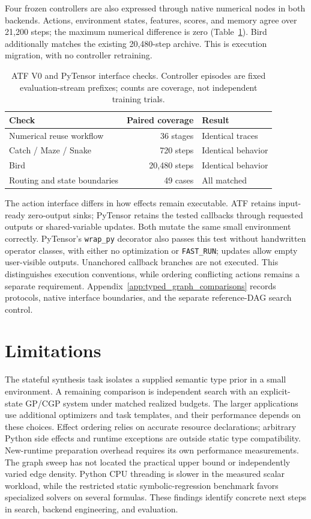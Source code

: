 Four frozen controllers are also expressed through native numerical nodes in both backends. Actions, environment states, features, scores, and memory agree over 21,200 steps; the maximum numerical difference is zero (Table~\ref{tab:typed_graph_interfaces}). Bird additionally matches the existing 20,480-step archive. This is execution migration, with no controller retraining.

\begin{table}[tb]
\centering\small
\caption{ATF V0 and PyTensor interface checks. Controller episodes are fixed evaluation-stream prefixes; counts are coverage, not independent training trials.}
\label{tab:typed_graph_interfaces}
\begin{tabular}{lrl}
\toprule
Check & Paired coverage & Result \\
\midrule
Numerical reuse workflow & 36 stages & Identical traces \\
Catch / Maze / Snake & 720 steps & Identical behavior \\
Bird & 20,480 steps & Identical behavior \\
Routing and state boundaries & 49 cases & All matched \\
\bottomrule
\end{tabular}
\end{table}

The action interface differs in how effects remain executable. ATF retains input-ready zero-output sinks; PyTensor retains the tested callbacks through requested outputs or shared-variable updates. Both mutate the same small environment correctly. PyTensor's \texttt{wrap\_py} decorator also passes this test without handwritten operator classes, with either no optimization or \texttt{FAST\_RUN}; updates allow empty user-visible outputs. Unanchored callback branches are not executed. This distinguishes execution conventions, while ordering conflicting actions remains a separate requirement. Appendix~\ref{app:typed_graph_comparisons} records protocols, native interface boundaries, and the separate reference-DAG search control.

\section*{Limitations}
\label{sec:limitations}
The stateful synthesis task isolates a supplied semantic type prior in a small environment. A remaining comparison is independent search with an explicit-state GP/CGP system under matched realized budgets. The larger applications use additional optimizers and task templates, and their performance depends on these choices. Effect ordering relies on accurate resource declarations; arbitrary Python side effects and runtime exceptions are outside static type compatibility. New-runtime preparation overhead requires its own performance measurements. The graph sweep has not located the practical upper bound or independently varied edge density. Python CPU threading is slower in the measured scalar workload, while the restricted static symbolic-regression benchmark favors specialized solvers on several formulas. These findings identify concrete next steps in search, backend engineering, and evaluation.

